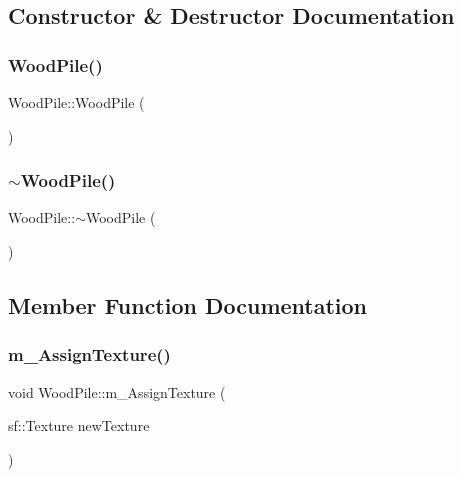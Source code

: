 \subsection{Constructor \& Destructor Documentation}
\mbox{\label{class_wood_pile_a9572061fc6db784b5acc68cde0c95435}} 
\subsubsection{\texorpdfstring{Wood\+Pile()}{WoodPile()}}
{\footnotesize\ttfamily Wood\+Pile\+::\+Wood\+Pile (\begin{DoxyParamCaption}{ }\end{DoxyParamCaption})}

\mbox{\label{class_wood_pile_a7bce94d6dd074921d7905d300f5cb82a}} 
\subsubsection{\texorpdfstring{$\sim$\+Wood\+Pile()}{~WoodPile()}}
{\footnotesize\ttfamily Wood\+Pile\+::$\sim$\+Wood\+Pile (\begin{DoxyParamCaption}{ }\end{DoxyParamCaption})}



\subsection{Member Function Documentation}
\mbox{\label{class_wood_pile_a32821c728e54c6c77c922e3c5a4d1cb8}} 
\subsubsection{\texorpdfstring{m\+\_\+\+Assign\+Texture()}{m\_AssignTexture()}}
{\footnotesize\ttfamily void Wood\+Pile\+::m\+\_\+\+Assign\+Texture (\begin{DoxyParamCaption}\item[{sf\+::\+Texture}]{new\+Texture }\end{DoxyParamCaption})}

